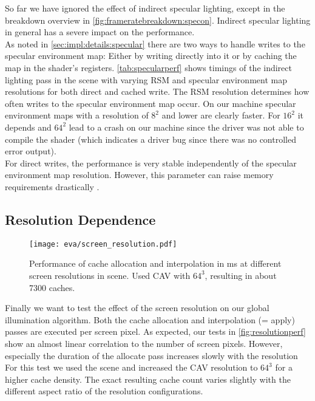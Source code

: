 \documentclass[thesis.tex]{subfiles}
\begin{document}
So far we have ignored the effect of indirect specular lighting, except in the breakdown overview in \autoref{fig:frameratebreakdown:specon}.
Indirect specular lighting in general has a severe impact on the performance.
\\
As noted in \autoref{sec:impl:details:specular} there are two ways to handle writes to the specular environment map:
Either by writing directly into it or by caching the map in the shader's registers.
\autoref{tab:specularperf} shows timings of the indirect lighting pass in the  scene with varying RSM and specular environment map resolutions for both direct and cached write.
The RSM resolution determines how often writes to the specular environment map occur.
On our machine specular environment maps with a resolution of $8^2$ and lower are clearly faster.
For $16^2$ it depends and $64^2$ lead to a crash on our machine since the driver was not able to compile the shader (which indicates a driver bug since there was no controlled error output).
\\
For direct writes, the performance is very stable independently of the specular environment map resolution.
However, this parameter can raise memory requirements drastically .

\subsection{Resolution Dependence}
\begin{figure}[h]
\centering
\texttt{[image: eva/screen\_resolution.pdf]}
\caption{Performance of cache allocation and interpolation in ms at different screen resolutions in  scene. Used CAV with $64^3$, resulting in about 7300 caches.}
\label{fig:resolutionperf}
\end{figure}
Finally we want to test the effect of the screen resolution on our global illumination algorithm.
Both the cache allocation and interpolation (= apply) passes are executed per screen pixel.
As expected, our tests in \autoref{fig:resolutionperf} show an almost linear correlation to the number of screen pixels.
However, especially the duration of the allocate pass increases slowly with the resolution
For this test we used the  scene and increased the CAV resolution to $64^3$ for a higher cache density.
The exact resulting cache count varies slightly with the different aspect ratio of the resolution configurations.
\end{document}
